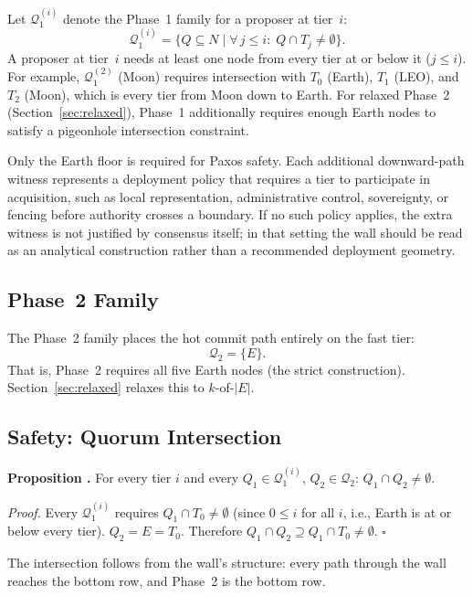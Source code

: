 \documentclass[letterpaper,twocolumn,10pt]{article}
\newcounter{prop}
\begin{document}
Let $\mathcal{Q}_1^{(i)}$ denote the Phase~1 family for a proposer at tier~$i$:
\[
\mathcal{Q}_1^{(i)} = \bigl\{Q \subseteq N \;\big|\; \forall\, j \le i:\; Q \cap T_j \neq \emptyset\bigr\}.
\]
A proposer at tier~$i$ needs at least one node from every tier at or below it ($j \le i$). For example, $\mathcal{Q}_1^{(2)}$ (Moon) requires intersection with $T_0$ (Earth), $T_1$ (LEO), and $T_2$ (Moon), which is every tier from Moon down to Earth. For relaxed Phase~2 (Section~\ref{sec:relaxed}), Phase~1 additionally requires enough Earth nodes to satisfy a pigeonhole intersection constraint.

Only the Earth floor is required for Paxos safety. Each additional downward-path witness represents a deployment policy that requires a tier to participate in acquisition, such as local representation, administrative control, sovereignty, or fencing before authority crosses a boundary. If no such policy applies, the extra witness is not justified by consensus itself; in that setting the wall should be read as an analytical construction rather than a recommended deployment geometry.

\subsection{Phase~2 Family}

The Phase~2 family places the hot commit path entirely on the fast tier:
\[
\mathcal{Q}_2 = \{E\}.
\]
That is, Phase~2 requires all five Earth nodes (the strict construction). Section~\ref{sec:relaxed} relaxes this to $k$-of-$|E|$.

\subsection{Safety: Quorum Intersection}

\label{prop:intersection}\textbf{Proposition \theprop.} For every tier $i$ and every $Q_1 \in \mathcal{Q}_1^{(i)}$, $Q_2 \in \mathcal{Q}_2$: $Q_1 \cap Q_2 \neq \emptyset$.

\textit{Proof.} Every $\mathcal{Q}_1^{(i)}$ requires $Q_1 \cap T_0 \neq \emptyset$ (since $0 \le i$ for all $i$, i.e., Earth is at or below every tier). $Q_2 = E = T_0$. Therefore $Q_1 \cap Q_2 \supseteq Q_1 \cap T_0 \neq \emptyset$. \hfill $\square$

The intersection follows from the wall's structure: every path through the wall reaches the bottom row, and Phase~2 is the bottom row.
\end{document}
